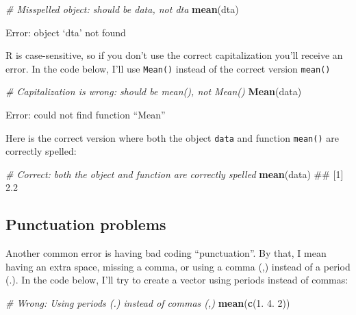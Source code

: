 \documentclass[]{book}
\newenvironment{Shaded}{\begin{snugshade}}{\end{snugshade}}
\newcommand{\KeywordTok}[1]{\textcolor[rgb]{0.13,0.29,0.53}{\textbf{{#1}}}}
\newcommand{\DecValTok}[1]{\textcolor[rgb]{0.00,0.00,0.81}{{#1}}}
\newcommand{\CommentTok}[1]{\textcolor[rgb]{0.56,0.35,0.01}{\textit{{#1}}}}
\newcommand{\NormalTok}[1]{{#1}}
\theoremstyle{definition}
\theoremstyle{definition}
\theoremstyle{remark}
\begin{document}
\begin{Shaded}
\begin{Highlighting}[]
\CommentTok{# Misspelled object: should be data, not dta}
\KeywordTok{mean}\NormalTok{(dta)}
\end{Highlighting}
\end{Shaded}

Error: object `dta' not found

R is case-sensitive, so if you don't use the correct capitalization
you'll receive an error. In the code below, I'll use \texttt{Mean()}
instead of the correct version \texttt{mean()}

\begin{Shaded}
\begin{Highlighting}[]
\CommentTok{# Capitalization is wrong: should be mean(), not Mean()}
\KeywordTok{Mean}\NormalTok{(data)}
\end{Highlighting}
\end{Shaded}

Error: could not find function ``Mean''

Here is the correct version where both the object \texttt{data} and
function \texttt{mean()} are correctly spelled:

\begin{Shaded}
\begin{Highlighting}[]
\CommentTok{# Correct: both the object and function are correctly spelled}
\KeywordTok{mean}\NormalTok{(data)}
\NormalTok{## [1] 2.2}
\end{Highlighting}
\end{Shaded}

\subsection{Punctuation problems}\label{punctuation-problems}

Another common error is having bad coding ``punctuation''. By that, I
mean having an extra space, missing a comma, or using a comma (,)
instead of a period (.). In the code below, I'll try to create a vector
using periods instead of commas:

\begin{Shaded}
\begin{Highlighting}[]
\CommentTok{# Wrong: Using periods (.) instead of commas (,)}
\KeywordTok{mean}\NormalTok{(}\KeywordTok{c}\NormalTok{(}\DecValTok{1}\NormalTok{. }\DecValTok{4}\NormalTok{. }\DecValTok{2}\NormalTok{))}
\end{Highlighting}
\end{Shaded}
\end{document}
